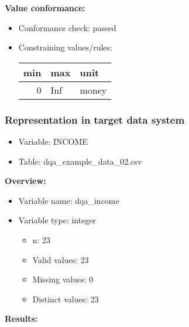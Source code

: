 \documentclass[
]{article}
\providecommand{\tightlist}{%
  \setlength{\itemsep}{0pt}\setlength{\parskip}{0pt}}
\begin{document}
\textbf{Value conformance:}

\begin{itemize}
\tightlist
\item
  Conformance check: passed
\item
  Constraining values/rules:

  \begin{table}[H]
  \centering
  \begin{tabular}{r|l|l}
  \hline
  \textbf{min} & \textbf{max} & \textbf{unit}\\
  \hline
  0 & Inf & money\\
  \hline
  \end{tabular}
  \end{table}
\end{itemize}

\newpage

\hypertarget{representation-in-target-data-system-7}{%
\subsubsection{\texorpdfstring{Representation in \textbf{target} data
system}{Representation in target data system}}\label{representation-in-target-data-system-7}}

\begin{itemize}
\tightlist
\item
  Variable: INCOME
\item
  Table: dqa\_example\_data\_02.csv
\end{itemize}

\textbf{Overview:}

\begin{itemize}
\tightlist
\item
  Variable name: dqa\_income
\item
  Variable type: integer

  \begin{itemize}
  \tightlist
  \item
    n: 23
  \item
    Valid values: 23
  \item
    Missing values: 0
  \item
    Distinct values: 23
  \end{itemize}
\end{itemize}

\textbf{Results:}\\
\end{document}
